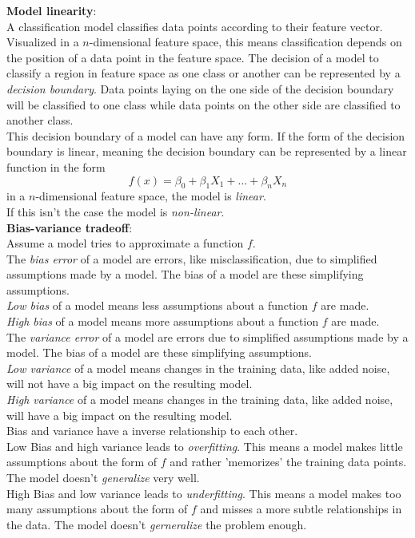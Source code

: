 \textbf{Model linearity}: \\
A classification model classifies data points according to their feature vector. Visualized in a $n$-dimensional feature space, this means classification depends on the position of a data point in the feature space. The decision of a model to classify a region in feature space as one class or another can be represented by a \emph{decision boundary}. Data points laying on the one side of the decision boundary will be classified to one class while data points on the other side are classified to another class.
\\
This decision boundary of a model can have any form. If the form of the decision boundary is linear, meaning the decision boundary can be represented by a linear function in the form 
\begin{equation} \label{eq:1}
f(x)=\beta_0 + \beta_1 X_1 + ... + \beta_n X_n
\end{equation}
in a $n$-dimensional feature space, the model is \emph{linear}.\\
If this isn't the case the model is \emph{non-linear}.
\\

\textbf{Bias-variance tradeoff}: \\
Assume a model tries to approximate a function $f$.
\\

The \emph{bias error} of a model are errors, like misclassification, due to simplified assumptions made by a model. The bias of a model are these simplifying assumptions. 
\\
\emph{Low bias} of a model means less assumptions about a function $f$ are made. 
\\
\emph{High bias} of a model means more assumptions about a function $f$ are made. 
\\

The \emph{variance error} of a model are errors due to simplified assumptions made by a model. The bias of a model are these simplifying assumptions. 
\\
\emph{Low variance} of a model means changes in the training data, like added noise, will not have a big impact on the resulting model.
\\
\emph{High variance} of a model means changes in the training data, like added noise, will have a big impact on the resulting model.
\\

Bias and variance have a inverse relationship to each other.\\
Low Bias and high variance leads to \emph{overfitting}. This means a model makes little assumptions about the form of $f$ and rather 'memorizes' the training data points. The model doesn't \emph{generalize} very well.
\\
High Bias and low variance leads to \emph{underfitting}. This means a model makes too many assumptions about the form of $f$ and misses a more subtle relationships in the data. The model doesn't \emph{gerneralize} the problem enough.
\\


